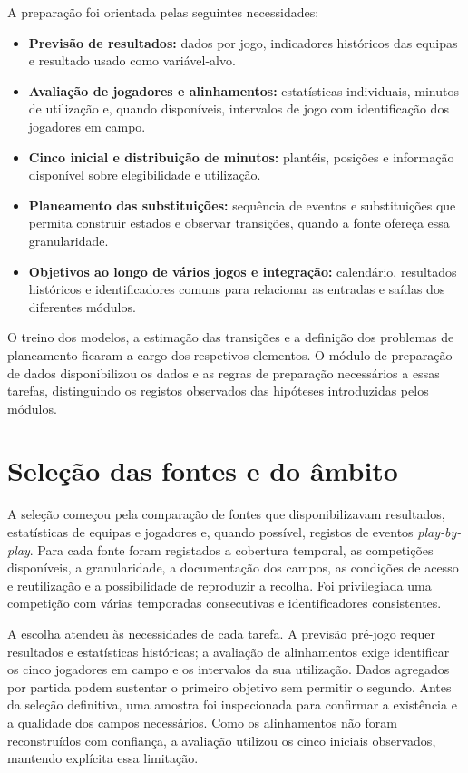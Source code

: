 A preparação foi orientada pelas seguintes necessidades:
\begin{itemize}
\item \textbf{Previsão de resultados:} dados por jogo,
indicadores históricos das equipas e resultado usado como variável-alvo.
\item \textbf{Avaliação de jogadores e alinhamentos:}
estatísticas individuais, minutos de utilização e, quando disponíveis,
intervalos de jogo com identificação dos jogadores em campo.
\item \textbf{Cinco inicial e distribuição de minutos:}
plantéis, posições e informação disponível sobre elegibilidade e utilização.
\item \textbf{Planeamento das substituições:} sequência
de eventos e substituições que permita construir estados e observar
transições, quando a fonte ofereça essa granularidade.
\item \textbf{Objetivos ao longo de vários jogos e
integração:} calendário, resultados históricos e identificadores comuns
para relacionar as entradas e saídas dos diferentes módulos.
\end{itemize}

O treino dos modelos, a estimação das transições e a definição dos
problemas de planeamento ficaram a cargo dos respetivos elementos.
O módulo de preparação de dados disponibilizou os dados e as regras de preparação necessários
a essas tarefas, distinguindo os registos observados das hipóteses
introduzidas pelos módulos.

\section{Seleção das fontes e do âmbito}

A seleção começou pela comparação de fontes que disponibilizavam
resultados, estatísticas de equipas e jogadores e, quando possível,
registos de eventos \emph{play-by-play}. Para cada fonte foram registados
a cobertura temporal, as competições disponíveis, a granularidade,
a documentação dos campos, as condições de acesso e reutilização e a
possibilidade de reproduzir a recolha. Foi privilegiada uma competição
com várias temporadas consecutivas e identificadores consistentes.

A escolha atendeu às necessidades de cada tarefa. A previsão
pré-jogo requer resultados e estatísticas históricas; a avaliação de
alinhamentos exige identificar os cinco jogadores em campo e os intervalos
da sua utilização. Dados agregados por partida podem sustentar o primeiro
objetivo sem permitir o segundo. Antes da seleção definitiva, uma amostra
foi inspecionada para confirmar a existência e a qualidade dos campos
necessários. Como os alinhamentos não foram reconstruídos com confiança,
a avaliação utilizou os cinco iniciais observados, mantendo explícita
essa limitação.

